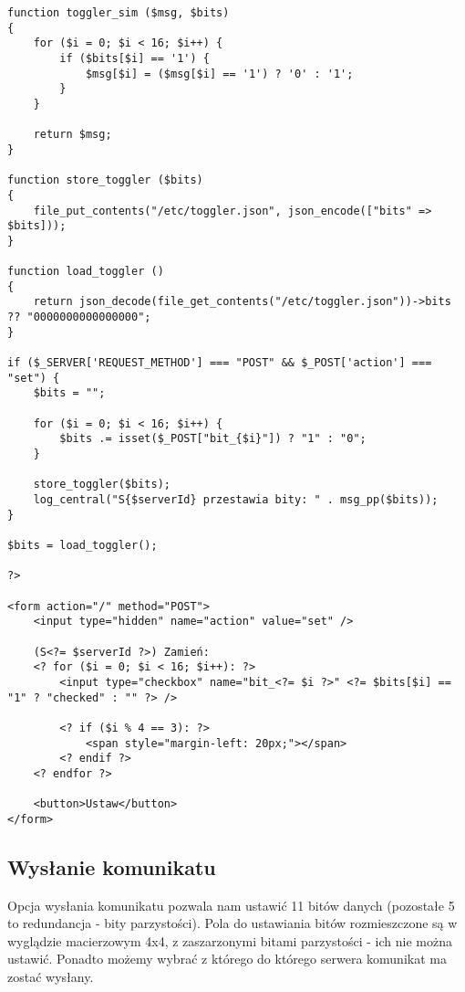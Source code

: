 \begin{empty}
	\begin{verbatim}
function toggler_sim ($msg, $bits)
{
	for ($i = 0; $i < 16; $i++) {
		if ($bits[$i] == '1') {
			$msg[$i] = ($msg[$i] == '1') ? '0' : '1';
		}
	}
	
	return $msg;
}

function store_toggler ($bits)
{
	file_put_contents("/etc/toggler.json", json_encode(["bits" => $bits]));
}

function load_toggler ()
{
	return json_decode(file_get_contents("/etc/toggler.json"))->bits ?? "0000000000000000";
}

if ($_SERVER['REQUEST_METHOD'] === "POST" && $_POST['action'] === "set") {
	$bits = "";
	
	for ($i = 0; $i < 16; $i++) {
		$bits .= isset($_POST["bit_{$i}"]) ? "1" : "0";
	}
	
	store_toggler($bits);
	log_central("S{$serverId} przestawia bity: " . msg_pp($bits));
}

$bits = load_toggler();

?>

<form action="/" method="POST">
	<input type="hidden" name="action" value="set" />

	(S<?= $serverId ?>) Zamień: 
	<? for ($i = 0; $i < 16; $i++): ?>
		<input type="checkbox" name="bit_<?= $i ?>" <?= $bits[$i] == "1" ? "checked" : "" ?> />
	
		<? if ($i % 4 == 3): ?>
			<span style="margin-left: 20px;"></span>
		<? endif ?>
	<? endfor ?>
	
	<button>Ustaw</button>
</form>
	\end{verbatim}
	\vspace{-10pt}
\end{empty}

\subsection{Wysłanie komunikatu}
Opcja wysłania komunikatu pozwala nam ustawić 11 bitów danych (pozostałe 5 to redundancja - bity parzystości). Pola do ustawiania bitów rozmieszczone są w wyglądzie macierzowym 4x4, z zaszarzonymi bitami parzystości - ich nie można ustawić. Ponadto możemy wybrać z którego do którego serwera komunikat ma zostać wysłany.

